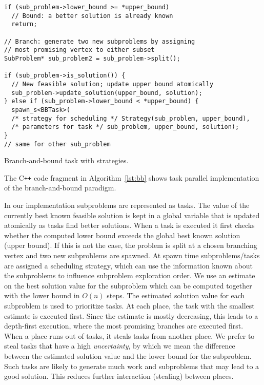 \documentclass[a4paper,11pt]{article}
\begin{document}
\begin{algorithm}
\begin{lstlisting}[mathescape=true,columns=flexible,escapechar=!]
if (sub_problem->lower_bound >= *upper_bound)
  // Bound: a better solution is already known
  return;

// Branch: generate two new subproblems by assigning
// most promising vertex to either subset
SubProblem* sub_problem2 = sub_problem->split();

if (sub_problem->is_solution()) {
  // New feasible solution; update upper bound atomically
  sub_problem->update_solution(upper_bound, solution);
} else if (sub_problem->lower_bound < *upper_bound) {
  spawn_s<BBTask>(
  /* strategy for scheduling */ Strategy(sub_problem, upper_bound),
  /* parameters for task */ sub_problem, upper_bound, solution);
}
// same for other sub_problem
\end{lstlisting}
\caption{Branch-and-bound task with strategies.}
\label{lst:bb}
\end{algorithm}

The C\verb!++! code fragment in Algorithm~\ref{lst:bb} shows task
parallel implementation of the branch-and-bound paradigm.

In our implementation subproblems are represented as tasks. The value
of the currently best known feasible solution is kept in a global
variable that is updated atomically as tasks find better
solutions. When a task is executed it first checks whether the
computed lower bound exceeds the global best known solution (upper
bound). If this is not the case, the problem is split at a chosen
branching vertex and two new subproblems are spawned. At spawn time
subproblems/tasks are assigned a scheduling strategy, which can use
the information known about the subproblems to influence subproblem
exploration order. We use an estimate on the best solution value for
the subproblem which can be computed together with the lower bound in
$O(n)$ steps.  The estimated solution value for each subproblem is
used to prioritize tasks. At each place, the task with the smallest
estimate is executed first.  Since the estimate is mostly decreasing,
this leads to a depth-first execution, where the most promising
branches are executed first.  When a place runs out of tasks, it
steals tasks from another place. We prefer to steal tasks that have a
high \emph{uncertainty}, by which we mean the difference between the
estimated solution value and the lower bound for the subproblem. Such
tasks are likely to generate much work and subproblems
that may lead to a good solution. This reduces further interaction
(stealing) between places.
\end{document}
